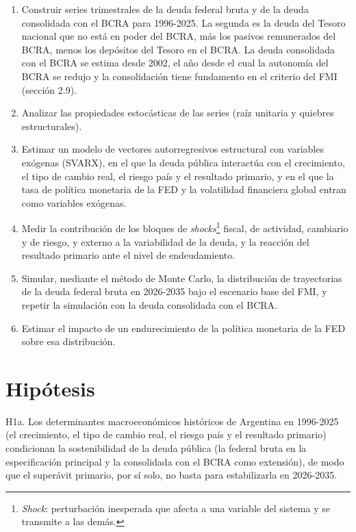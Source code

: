 \begin{enumerate}
\def\labelenumi{\arabic{enumi}.}
\tightlist
\item
  Construir series trimestrales de la deuda federal bruta y de la deuda
  consolidada con el BCRA para 1996-2025. La segunda es la deuda del
  Tesoro nacional que no está en poder del BCRA, más los pasivos
  remunerados del BCRA, menos los depósitos del Tesoro en el BCRA. La
  deuda consolidada con el BCRA se estima desde 2002, el año desde el
  cual la autonomía del BCRA se redujo y la consolidación tiene
  fundamento en el criterio del FMI (sección 2.9).
\item
  Analizar las propiedades estocásticas de las series (raíz unitaria y
  quiebres estructurales).
\item
  Estimar un modelo de vectores autorregresivos estructural con
  variables exógenas (SVARX), en el que la deuda pública interactúa con
  el crecimiento, el tipo de cambio real, el riesgo país y el resultado
  primario, y en el que la tasa de política monetaria de la FED y la
  volatilidad financiera global entran como variables exógenas.
\item
  Medir la contribución de los bloques de \emph{shocks}\footnote{\emph{Shock}:
    perturbación inesperada que afecta a una variable del sistema y se
    transmite a las demás.} fiscal, de actividad, cambiario y de riesgo,
  y externo a la variabilidad de la deuda, y la reacción del resultado
  primario ante el nivel de endeudamiento.
\item
  Simular, mediante el método de Monte Carlo, la distribución de
  trayectorias de la deuda federal bruta en 2026-2035 bajo el escenario
  base del FMI, y repetir la simulación con la deuda consolidada con el
  BCRA.
\item
  Estimar el impacto de un endurecimiento de la política monetaria de la
  FED sobre esa distribución.
\end{enumerate}

\section{Hipótesis}

H1a. Los determinantes macroeconómicos históricos de Argentina en
1996-2025 (el crecimiento, el tipo de cambio real, el riesgo país y el
resultado primario) condicionan la sostenibilidad de la deuda pública
(la federal bruta en la especificación principal y la consolidada con el
BCRA como extensión), de modo que el superávit primario, por sí solo, no
basta para estabilizarla en 2026-2035.

